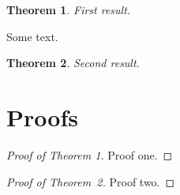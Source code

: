 \documentclass{article}
\newtheorem{theorem}{Theorem}
\newenvironment{proofof}[1]{\begin{proof}[Proof of #1]}{\end{proof}}
\begin{document}
\begin{theorem}
First result.
\end{theorem}
Some text.
\begin{theorem}
Second result.
\end{theorem}
\section{Proofs}
\begin{proofof}{Theorem 1}
Proof one.
\end{proofof}
\begin{proofof}{Theorem~2}
Proof two.
\end{proofof}
\end{document}
